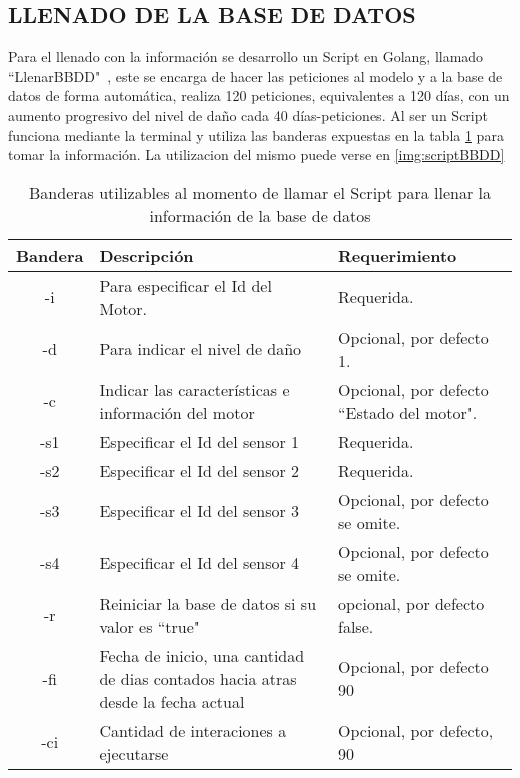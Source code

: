 \subsection{LLENADO DE LA BASE DE DATOS}
    Para el llenado con la información se desarrollo un Script en Golang,
    llamado ``LlenarBBDD"\ , este
    se encarga de hacer las peticiones al modelo y a la base de datos de forma
    automática, realiza 120 peticiones, equivalentes a 120 días, con un aumento
    progresivo del nivel de daño cada 40 días-peticiones. Al ser un Script funciona
    mediante la terminal y utiliza las banderas expuestas en la tabla
    \ref{tab:BanderasLLenadoBBDD} para tomar la información. La utilizacion del
    mismo puede verse en \ref{img:scriptBBDD}

\begin{table}[ht]
        \begin{center}
        \caption[Banderas Script para el llenado de la BBDD]{
        Banderas utilizables al momento de llamar el Script para llenar la información
        de la base de datos}
        \label{tab:BanderasLLenadoBBDD}

            \vspace{0.3cm}
            \begin{tabular}{|c|p{7cm}|p{5cm}|}
                \hline
                Bandera & Descripción & Requerimiento \\\hline
                -i & Para especificar el Id del Motor. & Requerida.\\\hline
                -d & Para indicar el nivel de daño  & Opcional, por defecto 1.\\\hline
                -c & Indicar las características e información del motor & Opcional, por defecto ``Estado del motor".\\\hline
                -s1& Especificar el Id del sensor 1 &Requerida.\\\hline
                -s2& Especificar el Id del sensor 2 &Requerida.\\\hline
                -s3& Especificar el Id del sensor 3 & Opcional, por defecto se omite.\\\hline
                -s4& Especificar el Id del sensor 4  &Opcional, por defecto se omite.\\\hline
                -r & Reiniciar la base de datos si su valor es ``true"& opcional, por defecto false.\\\hline
                -fi& Fecha de inicio, una cantidad de dias contados hacia atras desde la fecha actual& Opcional, por defecto 90\\\hline
                -ci& Cantidad de interaciones a ejecutarse&Opcional, por defecto, 90
                \\\hline
            \end{tabular}
        \end{center}
    \end{table}

